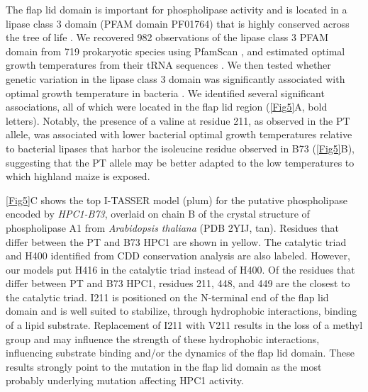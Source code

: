 \documentclass[9pt,twocolumn,twoside,lineno]{biorxiv}
\begin{document}
The flap lid domain is important for phospholipase activity and is located in a lipase class 3 domain (PFAM domain PF01764) that is highly conserved across the tree of life \cite{Jensen2021-zm}. 
We recovered 982 observations of the lipase class 3 PFAM domain from 719 prokaryotic species using PfamScan \cite{Potter2018-tk, El-Gebali2019-pw}, and estimated optimal growth temperatures from their tRNA sequences \cite{Cimen2020-dm}.
We then tested whether genetic variation in the lipase class 3 domain was significantly associated with optimal growth temperature in bacteria \cite{Jensen2021-iv}. 
We identified several significant associations, all of which were located in the flap lid region (\cref{Fig5}A, bold letters).  
Notably, the presence of a valine at residue 211, as observed in the PT allele, was associated with lower bacterial optimal growth temperatures relative to bacterial lipases that harbor the isoleucine residue observed in B73 (\cref{Fig5}B), suggesting that the PT allele may be better adapted to the low temperatures to which highland maize is exposed.

\cref{Fig5}C shows the top I-TASSER model (plum) for the putative phospholipase encoded by \textit{HPC1-B73}, overlaid on chain B of the crystal structure of phospholipase A1 from \textit{Arabidopsis thaliana} (PDB 2YIJ, tan). 
Residues that differ between the PT and B73 HPC1 are shown in yellow. 
The catalytic triad and H400 identified from CDD conservation analysis are also labeled.
However, our models put H416 in the catalytic triad instead of H400. 
Of the residues that differ between PT and B73 HPC1, residues 211, 448, and 449 are the closest to the catalytic triad. 
I211 is positioned on the N-terminal end of the flap lid domain and is well suited to stabilize, through hydrophobic interactions, binding of a lipid substrate.
Replacement of I211 with V211 results in the loss of a methyl group and may influence the strength of these hydrophobic interactions, influencing substrate binding and/or the dynamics of the flap lid domain.
These results strongly point to the mutation in the flap lid domain as the most probably underlying mutation affecting HPC1 activity.
\end{document}

